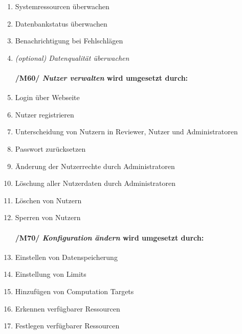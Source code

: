 \begin{enumerate}
    \setlength\itemsep{-1em}
    \item Systemressourcen überwachen %
    \item Datenbankstatus überwachen
    \item Benachrichtigung bei Fehlschlägen
    \item \textit{(optional) Datenqualität überwachen}
    
\paragraph{/M60/ \textit{Nutzer verwalten} wird umgesetzt durch:}

    \setlength\itemsep{-1em}
    \item Login über Webseite
    \item Nutzer registrieren
    \item Unterscheidung von Nutzern in Reviewer, Nutzer und Administratoren
    \item Passwort zurücksetzen
    \item Änderung der Nutzerrechte durch Administratoren
    \item Löschung aller Nutzerdaten durch Administratoren
    \item Löschen von Nutzern
    \item Sperren von Nutzern %
    
\paragraph{/M70/ \textit{Konfiguration ändern} wird umgesetzt durch:}

    \setlength\itemsep{-1em}
    \item Einstellen von Datenspeicherung
    \item Einstellung von Limits %
    \item Hinzufügen von Computation Targets %
    \item Erkennen verfügbarer Ressourcen
    \item Festlegen verfügbarer Ressourcen
\end{enumerate}